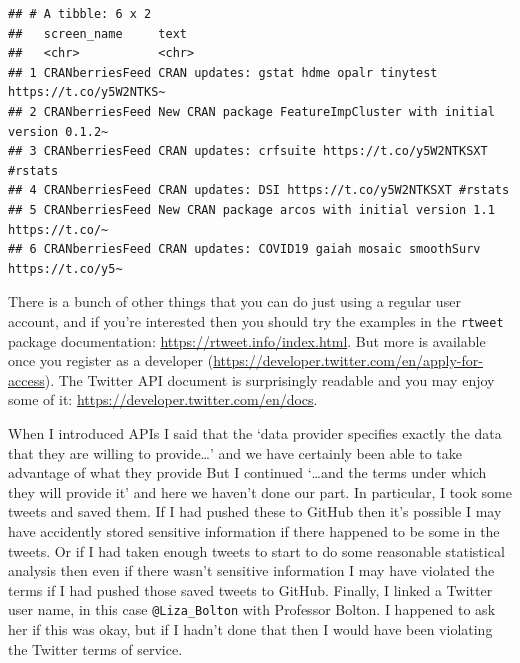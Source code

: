 \documentclass[
]{book}
\newenvironment{Shaded}{\begin{snugshade}}{\end{snugshade}}
\newcommand{\KeywordTok}[1]{\textcolor[rgb]{0.13,0.29,0.53}{\textbf{#1}}}
\newcommand{\NormalTok}[1]{#1}
\newcommand{\OperatorTok}[1]{\textcolor[rgb]{0.81,0.36,0.00}{\textbf{#1}}}
\newcommand{\StringTok}[1]{\textcolor[rgb]{0.31,0.60,0.02}{#1}}
\begin{document}
\begin{Shaded}
\end{Shaded}

\begin{verbatim}
## # A tibble: 6 x 2
##   screen_name     text                                                          
##   <chr>           <chr>                                                         
## 1 CRANberriesFeed CRAN updates: gstat hdme opalr tinytest https://t.co/y5W2NTKS~
## 2 CRANberriesFeed New CRAN package FeatureImpCluster with initial version 0.1.2~
## 3 CRANberriesFeed CRAN updates: crfsuite https://t.co/y5W2NTKSXT #rstats        
## 4 CRANberriesFeed CRAN updates: DSI https://t.co/y5W2NTKSXT #rstats             
## 5 CRANberriesFeed New CRAN package arcos with initial version 1.1 https://t.co/~
## 6 CRANberriesFeed CRAN updates: COVID19 gaiah mosaic smoothSurv https://t.co/y5~
\end{verbatim}

There is a bunch of other things that you can do just using a regular user account, and if you're interested then you should try the examples in the \texttt{rtweet} package documentation: \url{https://rtweet.info/index.html}. But more is available once you register as a developer (\url{https://developer.twitter.com/en/apply-for-access}). The Twitter API document is surprisingly readable and you may enjoy some of it: \url{https://developer.twitter.com/en/docs}.

When I introduced APIs I said that the `data provider specifies exactly the data that they are willing to provide\ldots{}' and we have certainly been able to take advantage of what they provide But I continued `\ldots and the terms under which they will provide it' and here we haven't done our part. In particular, I took some tweets and saved them. If I had pushed these to GitHub then it's possible I may have accidently stored sensitive information if there happened to be some in the tweets. Or if I had taken enough tweets to start to do some reasonable statistical analysis then even if there wasn't sensitive information I may have violated the terms if I had pushed those saved tweets to GitHub. Finally, I linked a Twitter user name, in this case \texttt{@Liza\_Bolton} with Professor Bolton. I happened to ask her if this was okay, but if I hadn't done that then I would have been violating the Twitter terms of service.
\end{document}

